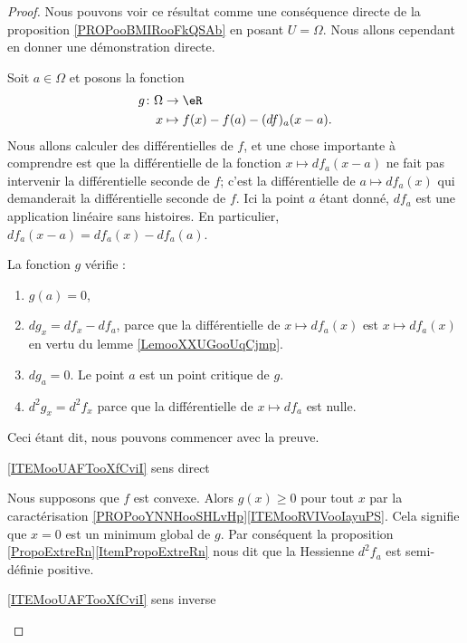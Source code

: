 \begin{proof}
    Nous pouvons voir ce résultat comme une conséquence directe de la proposition \ref{PROPooBMIRooFkQSAb} en posant \( U=\Omega\). Nous allons cependant en donner une démonstration directe.

    Soit \( a\in \Omega\) et posons la fonction 
    \begin{equation}
        \begin{aligned}
            g\colon \Omega&\to \eR \\
            x&\mapsto f(x)-f(a)-(df)_a(x-a). 
        \end{aligned}
    \end{equation}
    Nous allons calculer des différentielles de \( f\), et une chose importante à comprendre est que la différentielle de la fonction \( x\mapsto df_a(x-a)\) ne fait pas intervenir la différentielle seconde de \( f\); c'est la différentielle de \( a\mapsto df_a(x)\) qui demanderait la différentielle seconde de \( f\). Ici la point \( a\) étant donné, \( df_a\) est une application linéaire sans histoires. En particulier, \( df_a(x-a)=df_a(x)-df_a(a)\).

    La fonction \( g\) vérifie :
    \begin{enumerate}
        \item
            \( g(a)=0\),
        \item
            \( dg_x=df_x-df_a\), parce que la différentielle de \( x\mapsto df_a(x)\) est \( x\mapsto df_a(x)\) en vertu du lemme \ref{LemooXXUGooUqCjmp}.
        \item
            \( dg_a=0\). Le point \( a\) est un point critique de \( g\).
        \item
            \( d^2g_x=d^2f_x\) parce que la différentielle de \( x\mapsto df_a\) est nulle.
    \end{enumerate}
    Ceci étant dit, nous pouvons commencer avec la preuve.
    \begin{subproof}
        \item[\ref{ITEMooUAFTooXfCviI} sens direct]
            
            Nous supposons que \( f\) est convexe. Alors \( g(x)\geq 0\) pour tout \( x\) par la caractérisation \ref{PROPooYNNHooSHLvHp}\ref{ITEMooRVIVooIayuPS}. Cela signifie que \( x=0\) est un minimum global de \( g\). Par conséquent la proposition \ref{PropoExtreRn}\ref{ItemPropoExtreRn} nous dit que la Hessienne \( d^2f_a\) est semi-définie positive.
        

        \item[\ref{ITEMooUAFTooXfCviI} sens inverse]


\end{subproof}
\end{proof}
